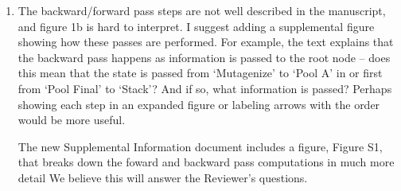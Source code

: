 \documentclass[11pt]{article}
\newenvironment{response}{\par\color{responseblue}}{\par}
\begin{document}
\begin{enumerate}
\begin{response}
Yes, the PoolParty codebase includes over 3{,}000 tests that can be run using pytest. In our experience, the coding agents were quite good at testing mechanical aspects of the code (e.g., invalid inputs and boundary conditions). However, human-written use cases (from which most of the manual tests were derived) were essential for testing the types of inputs and requests likely to be encountered in real biological applications. The current suite consists of a mixture of these two types of tests. We did not track the origin of each test, however, and so precisely quantify how many came from each source.  
\end{response}


\item The backward/forward pass steps are not well described in the manuscript,
and figure 1b is hard to interpret. I suggest adding a supplemental figure
showing how these passes are performed. For example, the text explains that the
backward pass happens as information is passed to the root node -- does this
mean that the state is passed from `Mutagenize' to `Pool A' in or first from
`Pool Final' to `Stack'? And if so, what information is passed? Perhaps showing
each step in an expanded figure or labeling arrows with the order would be more
useful.

\begin{response}
The new Supplemental Information document includes a figure, Figure S1, that  breaks down the foward and backward pass computations in much more detail We believe this will answer the Reviewer's questions. 
\end{response}



\end{enumerate}
\end{document}
